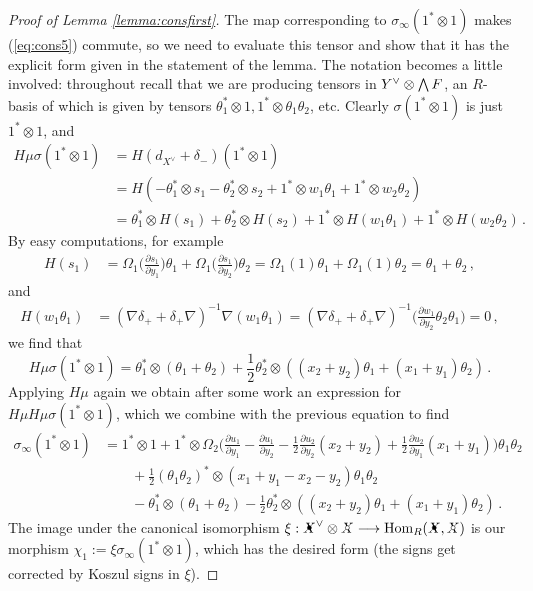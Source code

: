 \documentclass{compositio}
\theoremstyle{definition}
\numberwithin{equation}{section}
\def\Hom{\operatorname{Hom}}
\begin{document}
\begin{proof}[Proof of Lemma \ref{lemma:consfirst}]
The map corresponding to $\sigma_\infty(1^* \otimes 1)$ makes (\ref{eq:cons5}) commute, so we need to evaluate this tensor and show that it has the explicit form given in the statement of the lemma. The notation becomes a little involved: throughout recall that we are producing tensors in $Y^{\vee} \otimes \bigwedge F$, an $R$-basis of which is given by tensors $\theta_1^* \otimes 1, 1^* \otimes \theta_1\theta_2$, etc. Clearly $\sigma(1^* \otimes 1)$ is just $1^* \otimes 1$, and
\begin{align*}
H \mu \sigma(1^* \otimes 1) &= H( d_{X^{\lor}} + \delta_{-})(1^* \otimes 1)\\
&= H( -\theta_1^* \otimes s_1 - \theta_2^* \otimes s_2 + 1^* \otimes w_1 \theta_1 + 1^* \otimes w_2 \theta_2 )\\
&= \theta_1^* \otimes H(s_1) + \theta_2^* \otimes H(s_2) + 1^* \otimes H(w_1 \theta_1) + 1^* \otimes H(w_2 \theta_2) \, .
\end{align*}
By easy computations, for example
\begin{align*}
H(s_1) &= \Omega_1\Big( \frac{\partial s_1}{\partial y_1} \Big) \theta_1 + \Omega_1\Big( \frac{\partial s_1}{\partial y_2} \Big) \theta_2 = \Omega_1(1) \theta_1 + \Omega_1(1) \theta_2 = \theta_1 + \theta_2 \, ,
\end{align*}
and
\begin{align*}
H(w_1 \theta_1) &= (\nabla \delta_{+} + \delta_{+} \nabla)^{-1} \nabla( w_1 \theta_1 ) = (\nabla \delta_{+} + \delta_{+} \nabla)^{-1}\Big( \frac{\partial w_1}{\partial y_2} \theta_2 \theta_1 \Big) = 0 \, ,
\end{align*}
we find that
$$
H \mu \sigma(1^* \otimes 1) = \theta_1^* \otimes (\theta_1 + \theta_2) + \frac{1}{2}\theta_2^* \otimes ( (x_2 + y_2) \theta_1 + (x_1 + y_1) \theta_2) \, .
$$
Applying $H\mu$ again we obtain after some work an expression for $H\mu H\mu\sigma(1^* \otimes 1)$, which we combine with the previous equation to find
\begin{align*}
\sigma_\infty(1^* \otimes 1) &= 1^* \otimes 1 + 1^* \otimes \Omega_2\Big( \frac{\partial u_1}{\partial y_1} - \frac{\partial u_1}{\partial y_2} - \frac{1}{2} \frac{\partial u_2}{\partial y_2}(x_2 + y_2) + \frac{1}{2} \frac{\partial u_2}{\partial y_1}(x_1 + y_1) \Big)\theta_1 \theta_2  \\
& \qquad+  \frac{1}{2}(\theta_1 \theta_2)^* \otimes (x_1 + y_1 - x_2 - y_2) \theta_1 \theta_2  \\
& \qquad- \theta_1^* \otimes (\theta_1 + \theta_2) - \frac{1}{2} \theta_2^* \otimes ( (x_2+y_2)\theta_1 + (x_1+y_1)\theta_2 ) \, . 
\end{align*}
The image under the canonical isomorphism $\xi: \Xbul\mdual \otimes \Xcirc \lto \Hom_R(\Xbul, \Xcirc)$ is our morphism $\chi_1 := \xi \sigma_\infty(1^* \otimes 1)$, which has the desired form (the signs get corrected by Koszul signs in $\xi$).
\end{proof}
\end{document}
